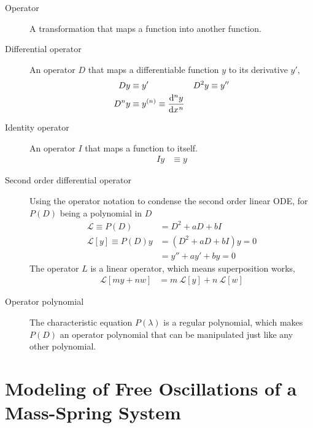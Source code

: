 \begin{description}
    \item[Operator] A transformation that maps a function into another function.
    \item[Differential operator] An operator $ D $ that maps a differentiable function $ y $ to
        its derivative $ y' $,
        \begin{align}
            Dy     & \equiv y'                                         & D^{2}y & \equiv y'' \\
            D^{n}y & \equiv y^{(n)} \equiv \difoverride{n} \diff[n] yx
        \end{align}
    \item[Identity operator] An operator $ I $ that maps a function to itself.
        \begin{align}
            Iy & \equiv y
        \end{align}
    \item[Second order differential operator] Using the operator notation to condense the
        second order linear ODE, for $ P(D) $ being a polynomial in $ D $
        \begin{align}
            \mathcal{L} \equiv P(D)            & = D^{2} + aD + bI        \\
            \mathcal{L}[y]\equiv P(D)y & = (D^{2} + aD + bI)y = 0 \\
                                     & = y'' + ay' + by = 0
        \end{align}
        The operator $ L $ is a linear operator, which means superposition works,
        \begin{align}
            \mathcal{L}[my + nw] & = m\ \mathcal{L}[y]+ n\ \mathcal{L}[w]
        \end{align}
    \item[Operator polynomial] The characteristic equation $ P(\lambda) $ is a regular
        polynomial, which makes $ P(D) $ an operator polynomial that can be manipulated
        just like any other polynomial.
\end{description}

\section{Modeling of Free Oscillations of a Mass-Spring System}


